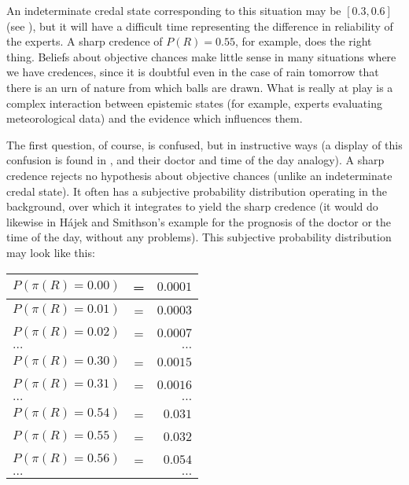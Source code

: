 An indeterminate credal state corresponding to this
situation may be $[0.3,0.6]$ (see
), but it will have a difficult
time representing the difference in reliability of the
experts. A sharp credence of $P(R)=0.55$, for example,
does the right thing. Beliefs about objective chances
make little sense in many situations where we have
credences, since it is doubtful even in the case of
rain tomorrow that there is an urn of nature from which
balls are drawn. What is really at play is a complex
interaction between epistemic states (for example,
experts evaluating meteorological data) and the
evidence which influences them.


The first question, of course, is confused, but in
instructive ways (a display of this confusion is found
in , and their doctor
and time of the day analogy). A sharp credence rejects
no hypothesis about objective chances (unlike an
indeterminate credal state). It often has a subjective
probability distribution operating in the background,
over which it integrates to yield the sharp credence
(it would do likewise in H{\'a}jek and Smithson's
example for the prognosis of the doctor or the time of
the day, without any problems). This subjective
probability distribution may look like this:

\begin{tabular}{|lcr|} 
  \hline
  $P(\pi(R)=0.00)$ & = & $0.0001$ \\ \hline
  $P(\pi(R)=0.01)$ & = & $0.0003$ \\ \hline
  $P(\pi(R)=0.02)$ & = & $0.0007$ \\ \hline
  $\ldots$ & & $\ldots$ \\ \hline
  $P(\pi(R)=0.30)$ & = & $0.0015$ \\ \hline
  $P(\pi(R)=0.31)$ & = & $0.0016$ \\ \hline
  $\ldots$ & & $\ldots$ \\ \hline
  $P(\pi(R)=0.54)$ & = & $0.031$ \\ \hline
  $P(\pi(R)=0.55)$ & = & $0.032$ \\ \hline
  $P(\pi(R)=0.56)$ & = & $0.054$ \\ \hline
  $\ldots$ & & $\ldots$ \\ \hline
\end{tabular}

